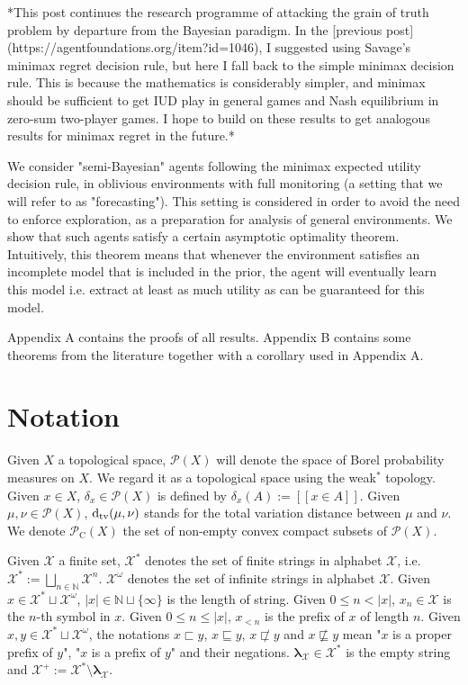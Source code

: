 \documentclass[a4paper]{article}
\newcommand{\Dtv}{\operatorname{d}_{\textnormal{tv}}}
\newcommand{\Nats}{\mathbb{N}}
\newcommand{\Estr}{\bm{\lambda}}
\newcommand{\Abs}[1]{\lvert #1 \rvert}
\newcommand{\Prob}{\mathcal{P}}
\newcommand{\CC}{\mathcal{P}_{\operatorname{C}}}
\begin{document}
*This post continues the research programme of attacking the grain of truth problem by departure from the Bayesian paradigm. In the [previous post](https://agentfoundations.org/item?id=1046), I suggested using Savage's minimax regret decision rule, but here I fall back to the simple minimax decision rule. This is because the mathematics is considerably simpler, and minimax should be sufficient to get IUD play in general games and Nash equilibrium in zero-sum two-player games. I hope to build on these results to get analogous results for minimax regret in the future.*

We consider "semi-Bayesian" agents following the minimax expected utility decision rule, in oblivious environments with full monitoring (a setting that we will refer to as "forecasting"). This setting is considered in order to avoid the need to enforce exploration, as a preparation for analysis of general environments. We show that such agents satisfy a certain asymptotic optimality theorem. Intuitively, this theorem means that whenever the environment satisfies an incomplete model that is included in the prior, the agent will eventually learn this model i.e. extract at least as much utility as can be guaranteed for this model.

Appendix A contains the proofs of all results. Appendix B contains some theorems from the literature together with a corollary used in Appendix A.

\section{Notation}

Given ${X}$ a topological space, ${\Prob(X)}$ will denote the space of Borel probability measures on ${X}$. We regard it as a topological space using the weak${^*}$ topology. Given ${x \in X}$, ${\delta_x \in \Prob(X)}$ is defined by ${\delta_x(A):=[[x \in A]]}$. Given ${\mu, \nu \in \Prob(X)}$, ${\Dtv(\mu, \nu)}$ stands for the total variation distance between ${\mu}$ and ${\nu}$. We denote ${\CC(X)}$ the set of non-empty convex compact subsets of ${\Prob(X)}$.

Given ${\mathcal{X}}$ a finite set, ${\mathcal{X}^*}$ denotes the set of finite strings in alphabet ${\mathcal{X}}$, i.e. ${\mathcal{X}^*:=\bigsqcup_{n \in \Nats} \mathcal{X}^n}$. ${\mathcal{X}^\omega}$ denotes the set of infinite strings in alphabet ${\mathcal{X}}$. Given ${x \in \mathcal{X}^* \sqcup \mathcal{X}^\omega}$, ${\Abs{x} \in \Nats \sqcup \{\infty\}}$ is the length of string. Given ${0 \leq n < \Abs{x}}$, ${x_n \in \mathcal{X}}$ is the ${n}$-th symbol in ${x}$. Given ${0 \leq n \leq \Abs{x}}$, ${x_{<n}}$ is the prefix of ${x}$ of length ${n}$. Given ${x,y \in \mathcal{X}^* \sqcup \mathcal{X}^\omega}$, the notations ${x \sqsubset y}$, ${x \sqsubseteq y}$, ${x \not\sqsubset y}$ and ${x \not\sqsubseteq y}$ mean "${x}$ is a proper prefix of ${y}$", "${x}$ is a prefix of ${y}$" and their negations. ${\Estr_\mathcal{X} \in \mathcal{X}^*}$ is the empty string and ${\mathcal{X}^{+}:=\mathcal{X}^* \setminus \Estr_\mathcal{X}}$. 
\end{document}
